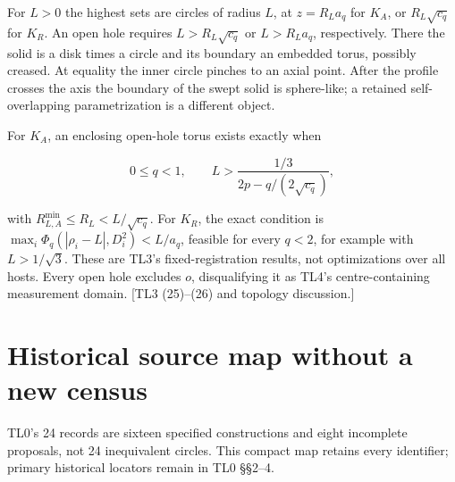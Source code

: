 \documentclass[11pt,a4paper]{article}
\begin{document}
For \(L>0\) the highest sets are circles of radius \(L\), at \(z=R_La_q\) for \(K_A\), or \(R_L\sqrt{c_q}\) for \(K_R\). An open hole requires \(L>R_L\sqrt{c_q}\) or \(L>R_La_q\), respectively. There the solid is a disk times a circle and its boundary an embedded torus, possibly creased. At equality the inner circle pinches to an axial point. After the profile crosses the axis the boundary of the swept solid is sphere-like; a retained self-overlapping parametrization is a different object.

For \(K_A\), an enclosing open-hole torus exists exactly when

\[
0\le q<1,\qquad
L>\frac{1/3}{2p-q/(2\sqrt{c_q})},
\tag{MA9}\label{eq:MA9}
\]

with \(R_{L,A}^{\min}\le R_L<L/\sqrt{c_q}\). For \(K_R\), the exact condition is \(\max_i\Phi_q(|\rho_i-L|,D_i^2)<L/a_q\), feasible for every \(q<2\), for example with \(L>1/\sqrt3\). These are TL3's fixed-registration results, not optimizations over all hosts. Every open hole excludes \(o\), disqualifying it as TL4's centre-containing measurement domain. [TL3 (25)--(26) and topology discussion.]

\section{Historical source map without a new census}

TL0's 24 records are sixteen specified constructions and eight incomplete proposals, not 24 inequivalent circles. This compact map retains every identifier; primary historical locators remain in TL0 \S{}\S{}2--4.
\end{document}
